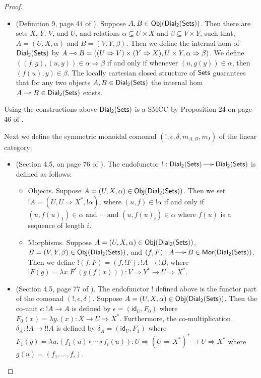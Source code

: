 \begin{proof}
\begin{report}
\begin{center}
\begin{itemize}
    \item (Definition 9, page 44 of \cite{dePaiva:1988}). Suppose
      $A,B \in \mathsf{Obj}(\mathsf{Dial_2}(\mathsf{Sets}))$.  Then there are sets $X$, $Y$, $V$, and
      $U$, and relations $\alpha \subseteq U \times X$ and
      $\beta \subseteq V \times Y$, such that, $A = (U,X,\alpha)$ and
      $B = (V,Y,\beta)$.  Then we define the internal hom of $\mathsf{Dial_2}(\mathsf{Sets})$
      by $A \multimap B = ((U \Rightarrow V) \times (Y \Rightarrow X),U
      \times Y,\alpha \Rightarrow \beta)$.  We define $((f,g),(u,y))
      \in \alpha \Rightarrow \beta$ if and only if whenever $(u,g(y))
      \in \alpha$, then $(f(u),y) \in \beta$.  The locally cartesian 
      closed structure of $\mathsf{Sets}$ guarantees that for any two objects $A, B \in
      \mathsf{Dial_2}(\mathsf{Sets})$ the internal hom $A \multimap B \in \mathsf{Dial_2}(\mathsf{Sets})$ exists.      
    \end{itemize}
  \end{center}
  Using the constructions above $\mathsf{Dial_2}(\mathsf{Sets})$ is a SMCC by Proposition 24
  on page 46 of \cite{dePaiva:1988}.  

  Next we define the symmetric monoidal comonad
  $(!,\epsilon,\delta,m_{A,B},m_I)$ of the linear category:
  \begin{center}
    \begin{itemize}
    \item (Section 4.5, on page 76 of \cite{dePaiva:1988}). The
      endofunctor $! : \mathsf{Dial_2}(\mathsf{Sets}) \to \mathsf{Dial_2}(\mathsf{Sets})$ is defined as follows:
      \begin{itemize}
      \item Objects. Suppose $A = (U,X,\alpha) \in \mathsf{Obj}(\mathsf{Dial_2}(\mathsf{Sets}))$.  Then
        we set $!A = (U,U \Rightarrow X^*, !\alpha)$, where
        $(u,f) \in !\alpha$ if and only if
        $(u,f(u)_1) \in \alpha \text{ and } \cdots \text{ and }
        (u,f(u)_i) \in \alpha$ where $f(u)$ is a sequence of length $i$.

      \item Morphisms. Suppose $A = (U,X,\alpha) \in \mathsf{Obj}(\mathsf{Dial_2}(\mathsf{Sets}))$,
        $B = (V,Y,\beta) \in \mathsf{Obj}(\mathsf{Dial_2}(\mathsf{Sets}))$, and
        $(f,F) : A \to B \in \mathsf{Mor(\mathsf{Dial_2}(\mathsf{Sets}))}$.  Then we define 
        $!(f,F) = (f,!F) : !A \to !B$, where $!F(g) = \lambda
        x.F^*(g(f(x))) : V \Rightarrow Y^* \to U \Rightarrow X^*$.
      \end{itemize}

    \item (Section 4.5, page 77 of \cite{dePaiva:1988}). The
      endofunctor $!$ defined above is the functor part of the comonad
      $(!,\epsilon, \delta)$.  Suppose
      $A = (U,X,\alpha) \in \mathsf{Obj}(\mathsf{Dial_2}(\mathsf{Sets}))$. Then the co-unit
      $\epsilon : !A \to A$ is defined by $\epsilon =
      (\mathsf{id}_U,F_0)$ where $F_0(x) = \lambda y.(x) : X \to U
      \Rightarrow X^*$.  
      Furthermore, the co-multiplication $\delta_A
      : !A \to !!A$ is defined by $\delta_A = (\mathsf{id}_U,F_1)$
      where $F_1(g) = \lambda u.(f_1(u) \circ \cdots \circ f_i(u)) : U \Rightarrow (U
      \Rightarrow X^*)^* \to U \Rightarrow X^*$ where $g(u) = (f_1,\ldots,f_i)$.


\end{itemize}
\end{center}
\end{report}
\end{proof}

